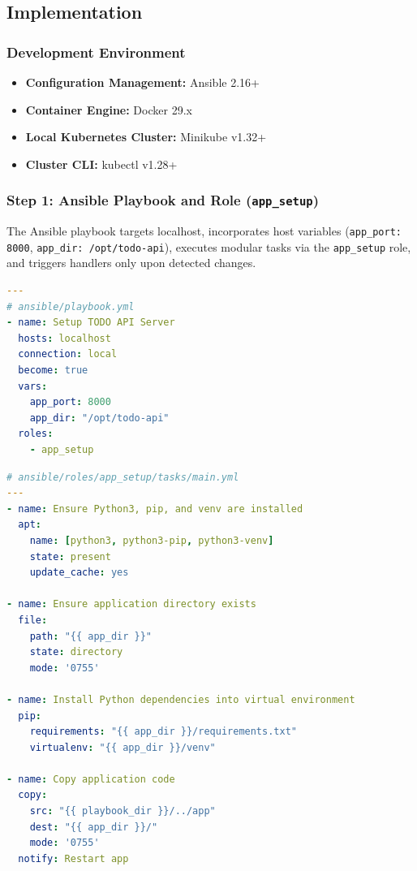 \documentclass[12pt,a4paper]{article}
\begin{document}
\subsection*{Implementation}

\subsubsection*{Development Environment}
\begin{itemize}[nosep]
    \item \textbf{Configuration Management:} Ansible 2.16+
    \item \textbf{Container Engine:} Docker 29.x
    \item \textbf{Local Kubernetes Cluster:} Minikube v1.32+
    \item \textbf{Cluster CLI:} kubectl v1.28+
\end{itemize}

\subsubsection*{Step 1: Ansible Playbook and Role (\texttt{app\_setup})}
The Ansible playbook targets localhost, incorporates host variables (\texttt{app\_port: 8000}, \texttt{app\_dir: /opt/todo-api}), executes modular tasks via the \texttt{app\_setup} role, and triggers handlers only upon detected changes.

\begin{lstlisting}[language=yaml]
---
# ansible/playbook.yml
- name: Setup TODO API Server
  hosts: localhost
  connection: local
  become: true
  vars:
    app_port: 8000
    app_dir: "/opt/todo-api"
  roles:
    - app_setup
\end{lstlisting}

\begin{lstlisting}[language=yaml]
# ansible/roles/app_setup/tasks/main.yml
---
- name: Ensure Python3, pip, and venv are installed
  apt:
    name: [python3, python3-pip, python3-venv]
    state: present
    update_cache: yes

- name: Ensure application directory exists
  file:
    path: "{{ app_dir }}"
    state: directory
    mode: '0755'

- name: Install Python dependencies into virtual environment
  pip:
    requirements: "{{ app_dir }}/requirements.txt"
    virtualenv: "{{ app_dir }}/venv"

- name: Copy application code
  copy:
    src: "{{ playbook_dir }}/../app"
    dest: "{{ app_dir }}/"
    mode: '0755'
  notify: Restart app
\end{lstlisting}
\end{document}
